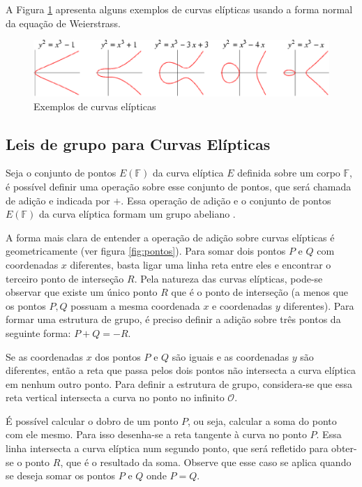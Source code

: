 A Figura \ref{fig:curvas} apresenta alguns exemplos de curvas elípticas usando a forma normal da equação de Weierstrass.

\begin{figure}[h]
\centering
\includegraphics[scale=0.5, bb=0 0 529 101]{figuras/curvas.eps}
\caption{Exemplos de curvas elípticas}
\label{fig:curvas}
\end{figure}

%
%
\subsection{Leis de grupo para Curvas Elípticas}
Seja o conjunto de pontos $E(\mathbb{F})$ da curva elíptica \(E\) definida sobre um corpo \(\mathbb{F}\), é possível definir uma operação sobre esse conjunto de pontos, que será chamada de adição e indicada por $+$. Essa operação de adição e o conjunto de pontos $E(\mathbb{F})$ da curva elíptica formam um grupo abeliano \cite{Stallings:2011}.

A forma mais clara de entender a operação de adição sobre curvas elípticas é geometricamente (ver figura \ref{fig:pontos}). Para somar dois pontos \(P\) e \(Q\) com coordenadas \(x\) diferentes, basta ligar uma linha reta entre eles e encontrar o terceiro ponto de interseção \(R\). Pela natureza das curvas elípticas, pode-se observar que existe um único ponto \(R\) que é o ponto de interseção (a menos que os pontos \(P, Q\) possuam a mesma coordenada $x$ e coordenadas $y$ diferentes). Para formar uma estrutura de grupo, é preciso  definir a adição sobre três pontos da seguinte forma: $P+Q=-R$. \cite{Stallings:2011}

Se as coordenadas \(x\) dos pontos \(P\) e \(Q\) são iguais e as coordenadas $y$ são diferentes, então a reta que passa pelos dois pontos não intersecta a curva elíptica em nenhum outro ponto. Para definir a estrutura de grupo, considera-se que essa reta vertical intersecta a curva no ponto no infinito $\mathcal{O}$. \cite{Stallings:2011}

É possível calcular o dobro de um ponto \(P\), ou seja, calcular a soma do ponto com ele mesmo. Para isso desenha-se a reta tangente à curva no ponto \(P\). Essa linha intersecta a curva elíptica num segundo ponto, que será refletido para obter-se o ponto \(R\), que é o resultado da soma. \cite{Guide} Observe que esse caso se aplica quando se deseja somar os pontos $P$ e $Q$ onde $P=Q$.

